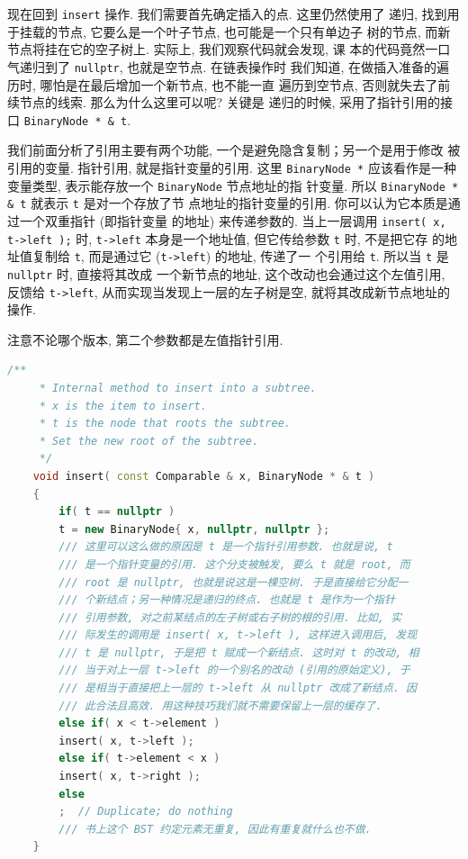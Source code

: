 \documentclass[a4paper]{ctexart}
\theoremstyle{definition}
\theoremstyle{definition}
\begin{document}
现在回到 \verb|insert| 操作. 我们需要首先确定插入的点. 这里仍然使用了
递归, 找到用于挂载的节点, 它要么是一个叶子节点, 也可能是一个只有单边子
树的节点, 而新节点将挂在它的空子树上. 实际上, 我们观察代码就会发现, 课
本的代码竟然一口气递归到了 \verb|nullptr|, 也就是空节点. 在链表操作时
我们知道, 在做插入准备的遍历时, 哪怕是在最后增加一个新节点, 也不能一直
遍历到空节点, 否则就失去了前续节点的线索. 那么为什么这里可以呢? 关键是
递归的时候, 采用了指针引用的接口 \verb|BinaryNode * & t|.

我们前面分析了引用主要有两个功能, 一个是避免隐含复制；另一个是用于修改
被引用的变量. 指针引用, 就是指针变量的引用. 这里 \verb|BinaryNode *|
应该看作是一种变量类型, 表示能存放一个 \verb|BinaryNode| 节点地址的指
针变量. 所以 \verb|BinaryNode * & t| 就表示 \verb|t| 是对一个存放了节
点地址的指针变量的引用. 你可以认为它本质是通过一个双重指针 (即指针变量
的地址) 来传递参数的. 当上一层调用 \verb|insert( x, t->left );| 时,
\verb|t->left| 本身是一个地址值, 但它传给参数 \verb|t| 时, 不是把它存
的地址值复制给 \verb|t|, 而是通过它 (\verb|t->left|) 的地址, 传递了一
个引用给 \verb|t|. 所以当 \verb|t| 是 \verb|nullptr| 时, 直接将其改成
一个新节点的地址, 这个改动也会通过这个左值引用, 反馈给 \verb|t->left|,
从而实现当发现上一层的左子树是空, 就将其改成新节点地址的操作. 

注意不论哪个版本, 第二个参数都是左值指针引用. 
\begin{lstlisting}[language=C++]
      /**
     * Internal method to insert into a subtree.
     * x is the item to insert.
     * t is the node that roots the subtree.
     * Set the new root of the subtree.
     */
    void insert( const Comparable & x, BinaryNode * & t )
	{
	    if( t == nullptr )
		t = new BinaryNode{ x, nullptr, nullptr };
	    /// 这里可以这么做的原因是 t 是一个指针引用参数. 也就是说, t
	    /// 是一个指针变量的引用. 这个分支被触发, 要么 t 就是 root, 而
	    /// root 是 nullptr, 也就是说这是一棵空树. 于是直接给它分配一
	    /// 个新结点；另一种情况是递归的终点. 也就是 t 是作为一个指针
	    /// 引用参数, 对之前某结点的左子树或右子树的根的引用. 比如, 实
	    /// 际发生的调用是 insert( x, t->left ), 这样进入调用后, 发现
	    /// t 是 nullptr, 于是把 t 赋成一个新结点. 这时对 t 的改动, 相
	    /// 当于对上一层 t->left 的一个别名的改动 (引用的原始定义), 于
	    /// 是相当于直接把上一层的 t->left 从 nullptr 改成了新结点. 因
	    /// 此合法且高效. 用这种技巧我们就不需要保留上一层的缓存了. 
	    else if( x < t->element )
		insert( x, t->left );
	    else if( t->element < x )
		insert( x, t->right );
	    else
		;  // Duplicate; do nothing
	    /// 书上这个 BST 约定元素无重复, 因此有重复就什么也不做. 
	}
\end{lstlisting}
\end{document}
